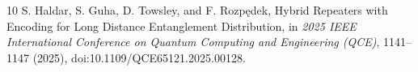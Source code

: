 \documentclass[aps,prx,preprint,superscriptaddress,nofootinbib,longbibliography]{revtex4-2}
\begin{document}
\begin{thebibliography}{10}
 S. Haldar, S. Guha, D. Towsley, and F. Rozp\k{e}dek, Hybrid Repeaters with Encoding for Long Distance Entanglement Distribution, in \emph{2025 IEEE International Conference on Quantum Computing and Engineering (QCE)}, 1141--1147 (2025), doi:10.1109/QCE65121.2025.00128.
\end{thebibliography}
\end{document}
